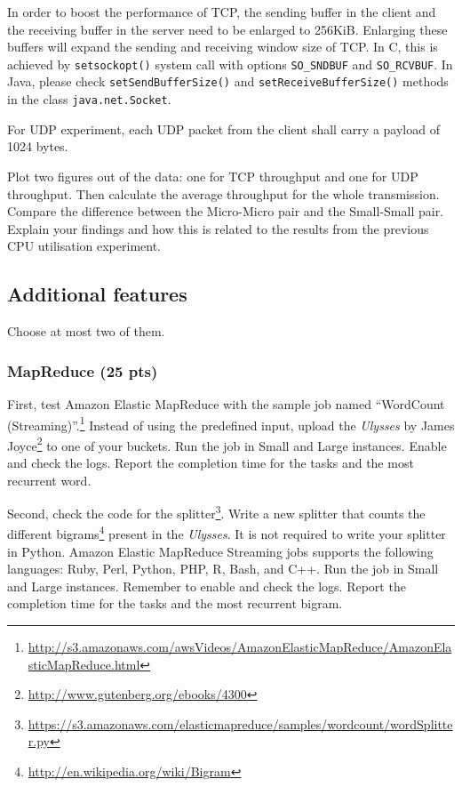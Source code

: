 \documentclass[12pt, a4paper]{article}
\begin{document}
In order to boost the performance of TCP, the sending buffer in the client and the receiving buffer in the server need to be enlarged to 256KiB.
Enlarging these buffers will expand the sending and receiving window size of TCP.
In C, this is achieved by \texttt{setsockopt()} system call with options \texttt{SO\_SNDBUF} and \texttt{SO\_RCVBUF}.
In Java, please check \texttt{setSendBufferSize()} and \texttt{setReceiveBufferSize()} methods in the class \texttt{java.net.Socket}.

For UDP experiment, each UDP packet from the client shall carry a payload of 1024 bytes.

Plot two figures out of the data: one for TCP throughput and one for UDP throughput.
Then calculate the average throughput for the whole transmission.
Compare the difference between the Micro-Micro pair and the Small-Small pair.
Explain your findings and how this is related to the results from the previous CPU utilisation experiment.
\subsection{Additional features}
Choose at most two of them.

\subsubsection{MapReduce (25 pts)}
First, test Amazon Elastic MapReduce with the sample job named ``WordCount (Streaming)''.\footnote{\url{http://s3.amazonaws.com/awsVideos/AmazonElasticMapReduce/AmazonElasticMapReduce.html}}
Instead of using the predefined input, upload the \emph{Ulysses} by James Joyce\footnote{\url{http://www.gutenberg.org/ebooks/4300}} to one of your buckets.
Run the job in Small and Large instances.
Enable and check the logs.
Report the completion time for the tasks and the most recurrent word.

Second, check the code for the splitter\footnote{\url{https://s3.amazonaws.com/elasticmapreduce/samples/wordcount/wordSplitter.py}}.
Write a new splitter that counts the different bigrams\footnote{\url{http://en.wikipedia.org/wiki/Bigram}} present in the \emph{Ulysses}.
It is not required to write your splitter in Python.
Amazon Elastic MapReduce Streaming jobs supports the following languages: Ruby, Perl, Python, PHP, R, Bash, and C++.
Run the job in Small and Large instances.
Remember to enable and check the logs.
Report the completion time for the tasks and the most recurrent bigram.
\end{document}
